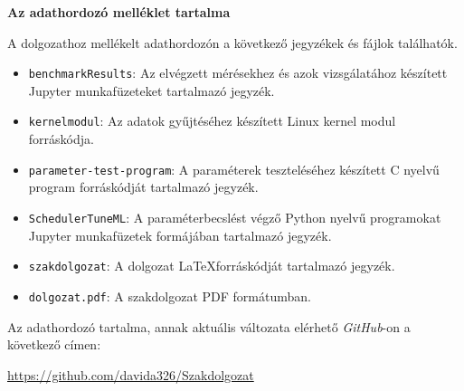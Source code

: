 \pagestyle{empty}

\noindent \textbf{\Large Az adathordozó melléklet tartalma}

\vskip 1cm


\noindent A dolgozathoz mellékelt adathordozón a következő jegyzékek és fájlok találhatók.

\begin{itemize}
	\item \texttt{benchmarkResults}: Az elvégzett mérésekhez és azok vizsgálatához készített \\ Jupyter munkafüzeteket tartalmazó jegyzék.
	\item \texttt{kernelmodul}: Az adatok gyűjtéséhez készített Linux kernel modul forráskódja.
	\item \texttt{parameter-test-program}: A paraméterek teszteléséhez készített C nyelvű program forráskódját tartalmazó jegyzék.
	\item \texttt{SchedulerTuneML}: A paraméterbecslést végző Python nyelvű programokat Jupyter munkafüzetek formájában tartalmazó jegyzék.
	\item \texttt{szakdolgozat}: A dolgozat \LaTeX forráskódját tartalmazó jegyzék.
	\item \texttt{dolgozat.pdf}: A szakdolgozat PDF formátumban.
\end{itemize}

\bigskip

\noindent Az adathordozó tartalma, annak aktuális változata elérhető \textit{GitHub}-on a következő címen:

\medskip

\hskip 24mm \url{https://github.com/davida326/Szakdolgozat}
